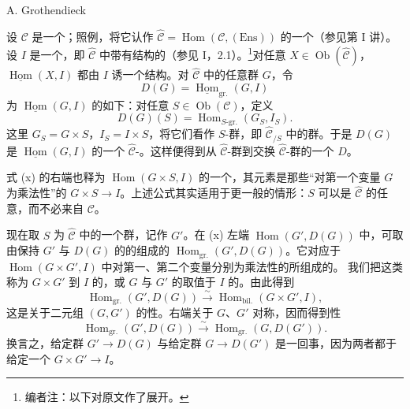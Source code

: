 \begin{center}A. Grothendieck\end{center}
设 $\mathcal C$ 是一个；照例，将它认作 $\widehat{\mathcal C}=\operatorname{Hom}(\mathcal C,(\mathrm{Ens}))$ 的一个（参见第 I 讲）。设 $I$ 是一个，即 $\widehat{\mathcal C}$ 中带有结构的（参见 I，2.1）。\footnote[1]{编者注：以下对原文作了展开。}对任意 $X\in\operatorname{Ob}(\widehat{\mathcal C})$， $\underline{\operatorname{Hom}}(X,I)$ 都由 $I$ 诱一个结构。对 $\widehat{\mathcal C}$ 中的任意群 $G$，令
\[
D(G)=\underline{\operatorname{Hom}}_{\mathrm{gr.}}(G,I)
\]
为 $\underline{\operatorname{Hom}}(G,I)$ 的如下：对任意 $S\in\operatorname{Ob}(\mathcal C)$，定义
\[
D(G)(S)=\operatorname{Hom}_{S\text{-}\mathrm{gr.}}(G_S,I_S).\tag{x}
\]
这里 $G_S=G\times S$，$I_S=I\times S$，将它们看作 $S$-群，即 $\widehat{\mathcal C}_{/S}$ 中的群。于是 $D(G)$ 是 $\underline{\operatorname{Hom}}(G,I)$ 的一个 $\widehat{\mathcal C}$-。这样便得到从 $\widehat{\mathcal C}$-群到交换 $\widehat{\mathcal C}$-群的一个 $D$。

式 (x) 的右端也释为 $\operatorname{Hom}(G\times S,I)$ 的一个，其元素是那些“对第一个变量 $G$ 为乘法性”的 $G\times S\to I$。上述公式其实适用于更一般的情形：$S$ 可以是 $\widehat{\mathcal C}$ 的任意，而不必来自 $\mathcal C$。

现在取 $S$ 为 $\widehat{\mathcal C}$ 中的一个群，记作 $G'$。在 (x) 左端 $\operatorname{Hom}(G',D(G))$ 中，可取由保持 $G'$ 与 $D(G)$ 的的组成的 $\operatorname{Hom}_{\mathrm{gr.}}(G',D(G))$。它对应于 $\operatorname{Hom}(G\times G',I)$ 中对第一、第二个变量分别为乘法性的所组成的。
我们把这类称为 $G\times G'$ 到 $I$ 的，或 $G$ 与 $G'$ 的取值于 $I$ 的。由此得到
\[
\operatorname{Hom}_{\mathrm{gr.}}(G',D(G))\xrightarrow{\sim}
\operatorname{Hom}_{\mathrm{bil.}}(G\times G',I),\tag{xx}
\]
这是关于二元组 $(G,G')$ 的性。右端关于 $G$、$G'$ 对称，因而得到性
\[
\operatorname{Hom}_{\mathrm{gr.}}(G',D(G))\xrightarrow{\sim}
\operatorname{Hom}_{\mathrm{gr.}}(G,D(G')).\tag{xxx}
\]
换言之，给定群 $G'\to D(G)$ 与给定群 $G\to D(G')$ 是一回事，因为两者都于给定一个 $G\times G'\to I$。

